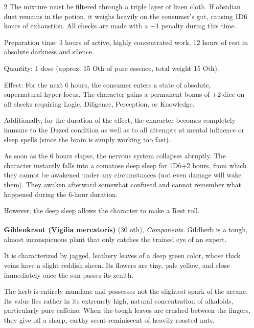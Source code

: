 \begin{multicols}{2}
The mixture must be filtered through a triple layer of linen cloth. If obsidian dust remains in the potion, it weighs heavily on the consumer’s gut, causing 1D6 hours of exhaustion. All checks are made with a +1 penalty during this time.

Preparation time:
3 hours of active, highly concentrated work. 12 hours of rest in absolute darkness and silence.

Quantity: 1 dose (approx. 15 Oth of pure essence, total weight 15 Oth).

Effect:
For the next 6 hours, the consumer enters a state of absolute, supernatural hyper-focus.
The character gains a permanent bonus of +2 dice on all checks requiring Logic, Diligence, Perception, or Knowledge.

Additionally, for the duration of the effect, the character becomes completely immune to the Dazed condition as well as to all attempts at mental influence or sleep spells (since the brain is simply working too fast).

As soon as the 6 hours elapse, the nervous system collapses abruptly. The character instantly falls into a comatose deep sleep for 1D6+2 hours, from which they cannot be awakened under any circumstances (not even damage will wake them). They awaken afterward somewhat confused and cannot remember what happened during the 6-hour duration.

However, the deep sleep allows the character to make a Rest roll.

    \paragraph{}
    \begin{denseitemize}
        \item \textbf{Gildenkraut (Vigilia mercatoris)} (30 oth), \textit{Components}.
        Gildherb is a tough, almost inconspicuous plant that only catches the trained eye of an expert.

It is characterized by jagged, leathery leaves of a deep green color, whose thick veins have a slight reddish sheen. Its flowers are tiny, pale yellow, and close immediately once the sun passes its zenith.

The herb is entirely mundane and possesses not the slightest spark of the arcane. Its value lies rather in its extremely high, natural concentration of alkaloids, particularly pure caffeine. When the tough leaves are crushed between the fingers, they give off a sharp, earthy scent reminiscent of heavily roasted nuts.


\end{denseitemize}
\end{multicols}
